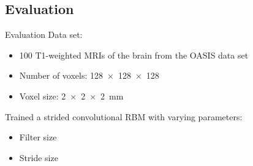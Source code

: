\documentclass{beamer}
\begin{document}

\subsection{Evaluation}

\begin{frame}{Evaluation}
Data set:
\begin{itemize}
\item 100 T1-weighted MRIs of the brain from the OASIS data set
\item Number of voxels: \num{128x128x128}
\item Voxel size: \SI{2x2x2}{\milli\metre}
\end{itemize}
Trained a strided convolutional RBM with varying parameters:
\begin{itemize}
\item Filter size
\item Stride size
\end{itemize}

\end{frame}
\end{document}

